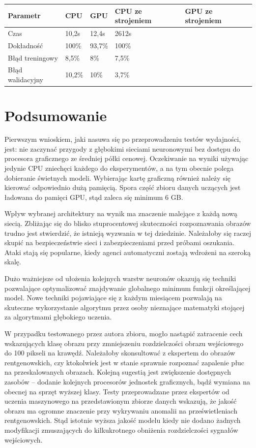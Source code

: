 \documentclass[12pt,a4paper,twoside,titlepage,openright]{book}
\begin{document}
\begin{itemize}
\begin{itemize}
\begin{center}
    \begin{tabular}{ | l | l | l | l | l |}
    \hline
    Parametr & CPU & GPU & CPU ze strojeniem & GPU ze strojeniem \\ \hline
    Czas & 10,2s & 12,4s & 2612s &  \\ \hline
    Dokładność & 100\% & 93,7\% & 100\% & \\ \hline
    Błąd treningowy & 8,5\% & 8\% & 7,5\% &  \\ \hline
    Błąd walidacyjny & 10,2\% & 10\% & 3,7\% &  \\ \hline
    \end{tabular}
\end{center}

\section{Podsumowanie}
Pierwszym wnioskiem, jaki nasuwa się po przeprowadzeniu testów wydajności, jest: nie zaczynać przygody z głębokimi sieciami neuronowymi bez dostępu do procesora graficznego ze średniej półki cenowej. Oczekiwanie na wyniki używając jedynie CPU zniechęci każdego do eksperymentów, a na tym obecnie polega dobieranie świetnych modeli. Wybierając kartę graficzną również należy się kierować odpowiednio dużą pamięcią. Spora część zbioru danych uczących jest ładowana do pamięci GPU, stąd zaleca się minimum 6 GB.

Wpływ wybranej architektury na wynik ma znaczenie malejące z każdą nową siecią. Zbliżając się do blisko stuprocentowej skuteczności rozpoznawania obrazów trudno jest stwierdzić, że istnieją wyzwania w tej dziedzinie. Należałoby się raczej skupić na bezpieczeństwie sieci i zabezpieczeniami przed próbami oszukania. Ataki stają się popularne, kiedy agenci automatyczni zostają wdrożeni na szeroką skalę.

Dużo ważniejsze od ułożenia kolejnych warstw neuronów okazują się techniki pozwalające optymalizować znajdywanie globalnego minimum funkcji określającej model. Nowe techniki pojawiające się z każdym miesiącem pozwalają na skuteczne wykorzystanie algorytmu przez osoby nieznające matematyki stojącej za algorytmami głębokiego uczenia.

W przypadku testowanego przez autora zbioru, mogło nastąpić zatracenie cech wskazujących klasę obrazu przy zmniejszeniu rozdzielczości obrazu wejściowego do 100 pikseli na krawędź. Należałoby skonsultować z ekspertem do obrazów rentgenowskich, czy ktokolwiek jest w stanie sprawnie rozpoznać zapalenie płuc na przeskalowanych obrazach. Kolejną sugestią jest zwiększenie dostępnych zasobów -- dodanie kolejnych procesorów jednostek graficznych, bądź wymiana na obecnej na sprzęt wyższej klasy. Testy przeprowadzane przez ekspertów od uczenia maszynowego na przedstawionym zbiorze danych wskazują, że jakość obrazu ma ogromne znaczenie przy wykrywaniu anomalii na prześwietleniach rentgenowskich. Stąd istotnie wyższa jakość modelu kiedy nie dodano żadnych modyfikacji zmuszających do kilkukrotnego obniżenia rozdzielczości sygnałów wejściowych.


\end{itemize}
\end{itemize}
\end{document}
